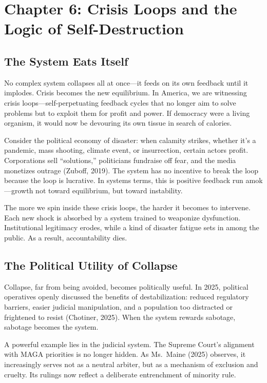 \documentclass[
]{article}
\author{}
\date{}
\begin{document}
\section{Chapter 6: Crisis Loops and the Logic of Self-Destruction}\label{chapter-6-crisis-loops-and-the-logic-of-self-destruction}

\subsection{The System Eats Itself}\label{the-system-eats-itself}

No complex system collapses all at once---it feeds on its own feedback until it implodes. Crisis becomes the new equilibrium. In America, we are witnessing crisis loops---self-perpetuating feedback cycles that no longer aim to solve problems but to exploit them for profit and power. If democracy were a living organism, it would now be devouring its own tissue in search of calories.

Consider the political economy of disaster: when calamity strikes, whether it's a pandemic, mass shooting, climate event, or insurrection, certain actors profit. Corporations sell ``solutions,'' politicians fundraise off fear, and the media monetizes outrage (Zuboff, 2019). The system has no incentive to break the loop because the loop is lucrative. In systems terms, this is positive feedback run amok---growth not toward equilibrium, but toward instability.

The more we spin inside these crisis loops, the harder it becomes to intervene. Each new shock is absorbed by a system trained to weaponize dysfunction. Institutional legitimacy erodes, while a kind of disaster fatigue sets in among the public. As a result, accountability dies.

\subsection{The Political Utility of Collapse}\label{the-political-utility-of-collapse}

Collapse, far from being avoided, becomes politically useful. In 2025, political operatives openly discussed the benefits of destabilization: reduced regulatory barriers, easier judicial manipulation, and a population too distracted or frightened to resist (Chotiner, 2025). When the system rewards sabotage, sabotage becomes the system.

A powerful example lies in the judicial system. The Supreme Court's alignment with MAGA priorities is no longer hidden. As Ms.~Maine (2025) observes, it increasingly serves not as a neutral arbiter, but as a mechanism of exclusion and cruelty. Its rulings now reflect a deliberate entrenchment of minority rule.
\end{document}
